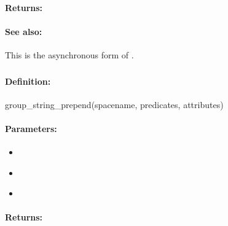 \paragraph{Returns:}


\paragraph{See also:}  This is the asynchronous form of .

\pagebreak
\subsubsection{}
\label{api:ruby:group_string_prepend}


\paragraph{Definition:}
\begin{rubycode}
group_string_prepend(spacename, predicates, attributes)
\end{rubycode}

\paragraph{Parameters:}
\begin{itemize}[noitemsep]
\item {}\\

\item {}\\

\item {}\\

\end{itemize}

\paragraph{Returns:}


\pagebreak
\subsubsection{}
\label{api:ruby:async_group_string_prepend}


